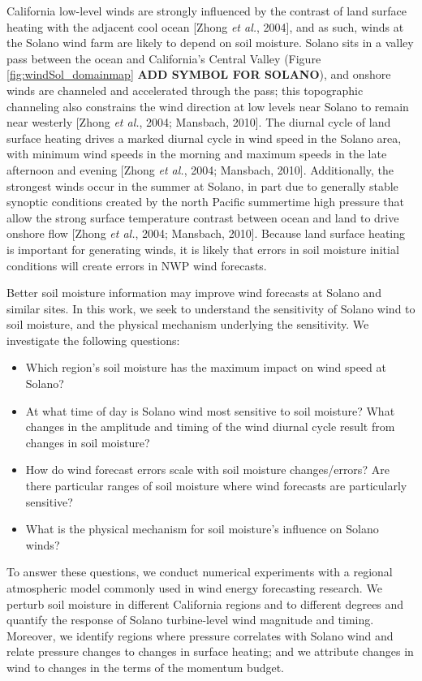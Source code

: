 California low-level winds are strongly influenced by the contrast of land surface heating with the adjacent cool ocean [Zhong \textit{et al.}, 2004], and as such, winds at the Solano wind farm are likely to depend on soil moisture.  Solano sits in a valley pass between the ocean and California's Central Valley (Figure \ref{fig:windSol_domainmap} \textbf{ADD SYMBOL FOR SOLANO}), and onshore winds are channeled and accelerated through the pass; this topographic channeling also constrains the wind direction at low levels near Solano to remain near westerly [Zhong \textit{et al.}, 2004; Mansbach, 2010].  The diurnal cycle of land surface heating drives a marked diurnal cycle in wind speed in the Solano area, with minimum wind speeds in the morning and maximum speeds in the late afternoon and evening [Zhong \textit{et al.}, 2004; Mansbach, 2010].  Additionally, the strongest winds occur in the summer at Solano, in part due to generally stable synoptic conditions created by the north Pacific summertime high pressure that allow the strong surface temperature contrast between ocean and land to drive onshore flow [Zhong \textit{et al.}, 2004; Mansbach, 2010]. Because land surface heating is important for generating winds, it is likely that errors in soil moisture initial conditions will create errors in NWP wind forecasts.

Better soil moisture information may improve wind forecasts at Solano and similar sites.  In this work, we seek to understand the sensitivity of Solano wind to soil moisture, and the physical mechanism underlying the sensitivity.  We investigate the following questions:
\begin{itemize}
\item Which region's soil moisture has the maximum impact on wind speed at Solano?
\item At what time of day is Solano wind most sensitive to soil moisture?  What changes in the amplitude and timing of the wind diurnal cycle result from changes in soil moisture?
\item How do wind forecast errors scale with soil moisture changes/errors?  Are there particular ranges of soil moisture where wind forecasts are particularly sensitive?
\item What is the physical mechanism for soil moisture's influence on Solano winds?
\end{itemize}

To answer these questions, we conduct numerical experiments with a regional atmospheric model commonly used in wind energy forecasting research.  We perturb soil moisture in different California regions and to different degrees and quantify the response of Solano turbine-level wind magnitude and timing.  Moreover, we identify regions where pressure correlates with Solano wind and relate pressure changes to changes in surface heating; and we attribute changes in wind to changes in the terms of the momentum budget.

